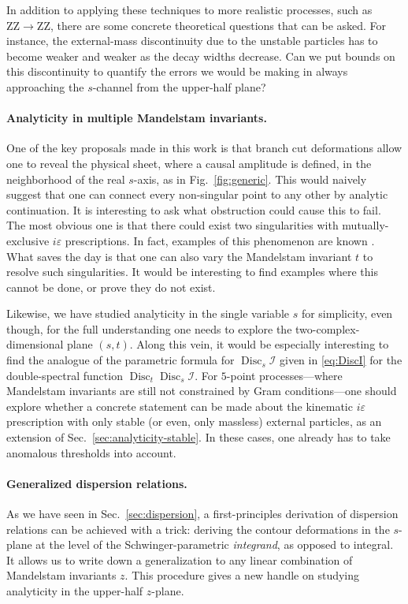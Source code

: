\documentclass[12pt]{article}
\numberwithin{figure}{section}
\DeclareMathOperator{\Disc}{Disc}
\def \eps {\varepsilon}
\def \I {\mathcal{I}}
\begin{document}
In addition to applying these techniques to more realistic processes, such as $\mathrm{ZZ}\to \mathrm{ZZ}$, there are some concrete theoretical questions that can be asked.
For instance, the external-mass discontinuity due to the unstable particles has to become weaker and weaker as the decay widths decrease. Can we put bounds on this discontinuity to quantify the errors we would be making in always approaching the $s$-channel from the upper-half plane?


\paragraph{Analyticity in multiple Mandelstam invariants.}
One of the key proposals made in this work is that branch cut deformations allow one to reveal the physical sheet, where a causal amplitude is defined, in the neighborhood of the real $s$-axis, as in Fig.~\ref{fig:generic}. This would naively suggest that one can connect every non-singular point to any other by analytic continuation.
It is interesting to ask what obstruction could cause this to fail.
The most obvious one is that there could exist two singularities with mutually-exclusive $i\eps$ prescriptions. In fact, examples of this phenomenon are known \cite{Chandler:1969nd}. What saves the day is that one can also vary the Mandelstam invariant $t$ to resolve such singularities. It would be interesting to find examples where this cannot be done, or prove they do not exist.

Likewise, we have studied analyticity in the single variable $s$ for simplicity, even though, for the full understanding one needs to explore the two-complex-dimensional plane $(s,t)$. Along this vein, it would be especially interesting to find the analogue of the parametric formula for $\Disc_s \I$ given in \eqref{eq:DiscI} for the double-spectral function $\Disc_t \Disc_s \I$.
For $5$-point processes---where Mandelstam invariants are still not constrained by Gram conditions---one should explore whether a concrete statement can be made about the kinematic $i\eps$ prescription with only stable (or even, only massless) external particles, as an extension of Sec.~\ref{sec:analyticity-stable}. In these cases, one already has to take anomalous thresholds into account.



\paragraph{Generalized dispersion relations.}
As we have seen in Sec.~\ref{sec:dispersion}, a first-principles derivation of dispersion relations can be achieved with a trick: deriving the contour deformations in the $s$-plane at the level of the Schwinger-parametric \emph{integrand}, as opposed to integral.
It allows us to write down a generalization to any linear combination of Mandelstam invariants $z$.
This procedure gives a new handle on studying analyticity in the upper-half $z$-plane.
\end{document}
